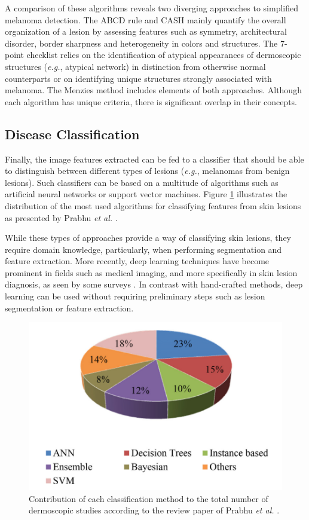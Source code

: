     A comparison of these algorithms reveals two diverging approaches to simplified melanoma detection. The ABCD rule and CASH mainly quantify the overall organization of a lesion by assessing features such as symmetry, architectural disorder, border sharpness and heterogeneity in colors and structures. The 7-point checklist relies on the identification of atypical appearances of dermoscopic structures (\textit{e.g.}, atypical network) in distinction from otherwise normal counterparts or on identifying unique structures strongly associated with melanoma. The Menzies method includes elements of both approaches. Although each algorithm has unique criteria, there is significant overlap in their concepts. \par
    
    \subsection{Disease Classification}
    Finally, the image features extracted can be fed to a classifier that should be able to distinguish between different types of lesions (\textit{e.g.}, melanomas from benign lesions). Such classifiers can be based on a multitude of algorithms such as artificial neural networks or support vector machines. Figure \ref{fig:classificationalgorithms} illustrates the distribution of the most used algorithms for classifying features from skin lesions as presented by Prabhu \textit{et al.} \cite{Pathan2018}. \par
    
    While these types of approaches provide a way of classifying skin lesions, they require domain knowledge, particularly, when performing segmentation and feature extraction. More recently, deep learning techniques have become prominent in fields such as medical imaging, and more specifically in skin lesion diagnosis, as seen by some surveys \cite{Hu2018} \cite{Litjens2017}. In contrast with hand-crafted methods, deep learning can be used without requiring preliminary steps such as lesion segmentation or feature extraction. \par
    
    \begin{figure}[ht]
      \centering
        \includegraphics[width=0.5\linewidth]{figs/classificationalgorithms.png}
      \caption{Contribution of each classification method to the total number of dermoscopic studies according to the review paper of Prabhu \textit{et al.} \cite{Pathan2018}.}
      \label{fig:classificationalgorithms}
    \end{figure}

